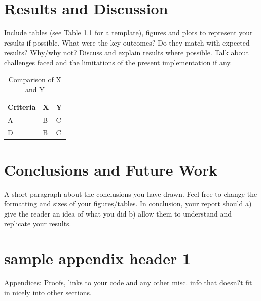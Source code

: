 \documentclass[12pt]{report}
\begin{document}
\chapter{Results and Discussion}
Include tables (see Table \ref{XYComparison} for a template), figures and plots to represent your results if possible. What were the key outcomes? Do they match with expected results? Why/why not? Discuss and explain results where possible. Talk about challenges faced and the limitations of the present implementation if any. 
\begin{table}[ht]
\label{XYComparison}
\begin{center}
\begin{tabular} {l|l|l} %
\hline
\hline
\textbf{Criteria} & \textbf{X} & \textbf{Y}  \\
\hline
A & B & C \\
D & B & C \\
\hline 
\hline
\end{tabular}
\end{center}
\caption{Comparison of  X and Y}
\end{table}

\chapter{Conclusions and Future Work}
A short paragraph about the conclusions you have drawn. Feel free to change the formatting and sizes of your figures/tables. In conclusion, your report should a) give the reader an idea of what you did b) allow them to understand and replicate your results.


 

\appendix 
\chapter{sample appendix header 1}
Appendices: 
Proofs, links to your code and any other misc. info that doesn?t fit in nicely into other sections. 
\end{document}
